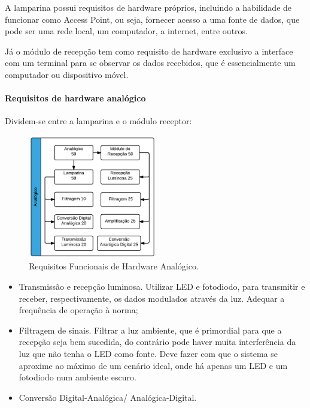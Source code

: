 	A lamparina possui requisitos de hardware próprios, incluindo a habilidade de funcionar como Access Point, ou seja, fornecer acesso a uma fonte de dados, que pode ser uma rede local, um computador, a internet, entre outros. 
	
	Já o módulo de recepção tem como requisito de hardware exclusivo a interface com um terminal para se observar os dados recebidos, que é essencialmente um computador ou dispositivo móvel.	
	
	\paragraph{Requisitos de hardware analógico} 
	Dividem-se entre a lamparina e o módulo receptor:
	
	\begin{figure}[h!]
		\caption{\label{fig_req1_2}Requisitos Funcionais de Hardware Analógico.}
		\centering
		\includegraphics[width=0.5\textwidth]{Req_Tree_Analog.pdf}
	\end{figure}
	
	\begin{itemize}  
		\item Transmissão e recepção luminosa. Utilizar LED e fotodiodo, para transmitir e receber, respectivamente, os dados modulados através da luz. Adequar a frequência de operação à norma;
		\item Filtragem de sinais. Filtrar a luz ambiente, que é primordial para que a recepção seja bem sucedida, do contrário pode haver muita interferência da luz que não tenha o LED como fonte. Deve fazer com que o sistema se aproxime ao máximo de um cenário ideal, onde há apenas um LED e um fotodiodo num ambiente escuro.
		\item Conversão Digital-Analógica/ Analógica-Digital. 
	\end{itemize} 
	
